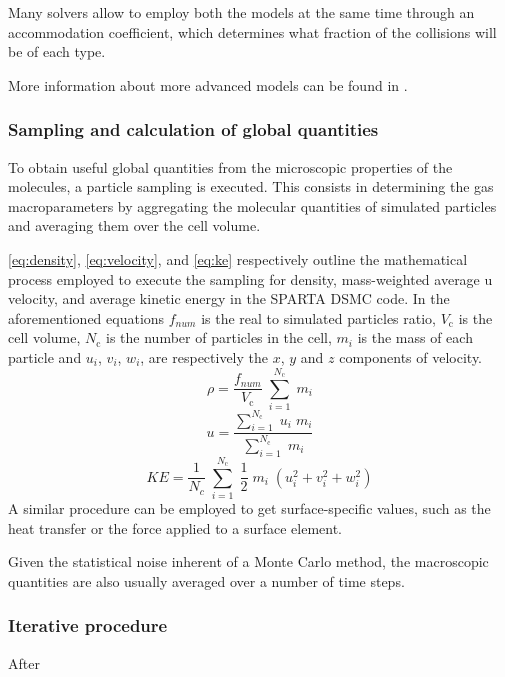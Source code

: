 Many solvers allow to employ both the models at the same time through an accommodation coefficient, which determines what fraction of the collisions will be of each type.

More information about more advanced models can be found in \cite{spartadoc}.

\subsubsection{Sampling and calculation of global quantities}
\label{subsection:sampling}

To obtain useful global quantities from the microscopic properties of the molecules, a particle sampling is executed. This consists in determining the gas macroparameters by aggregating the molecular quantities of simulated particles and averaging them over the cell volume. 

\autoref{eq:density}, \autoref{eq:velocity}, and \autoref{eq:ke} respectively outline the mathematical process employed to execute the sampling for density, mass-weighted average u velocity, and average kinetic energy in the SPARTA DSMC code. In the aforementioned equations $f_{num}$ is the real to simulated particles ratio, $V_{\mathrm{c}}$ is the cell volume, $N_{\mathrm{c}}$ is the number of particles in the cell, $m_i$ is the mass of each particle and $u_i$, $v_i$, $w_i$, are respectively the $x$, $y$ and $z$ components of velocity.
\begin{equation}
    \rho = \frac{f_{num}}{V_{\mathrm{c}}}\; \sum_{i=1}^{N_{\mathrm{c}}}\; m_i
    \label{eq:density}
\end{equation}
\begin{equation}
    u = \frac{\sum_{i=1}^{N_{\mathrm{c}}}\; u_i\; m_i}{\sum_{i=1}^{N_{\mathrm{c}}}\; m_i} 
    \label{eq:velocity}
\end{equation}
\begin{equation}
    KE = \frac{1}{N_c}\; \sum_{i=1}^{N_{\mathrm{c}}}\; \frac{1}{2}\; m_i\; (u_i^2+v_i^2+w_i^2)
    \label{eq:ke}
\end{equation}
A similar procedure can be employed to get surface-specific values, such as the heat transfer or the force applied to a surface element.

Given the statistical noise inherent of a Monte Carlo method, the macroscopic quantities are also usually averaged over a number of time steps.

\subsubsection{Iterative procedure}
After 

